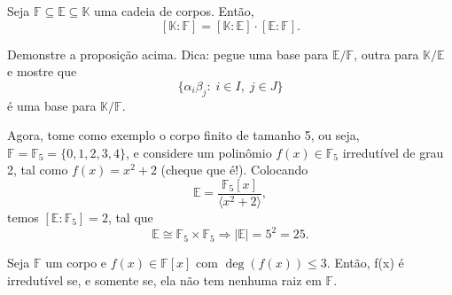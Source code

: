 \documentclass[../algebraIII_notes.tex]{subfiles}
\begin{document}
\begin{prop*}
	Seja \(\mathbb{F}\subseteq \mathbb{E}\subseteq \mathbb{K}\) uma cadeia de corpos. Então,
	\[
		[\mathbb{K}:\mathbb{F}] = [\mathbb{K}:\mathbb{E}] \cdot [\mathbb{E}:\mathbb{F}].
	\]
\end{prop*}
\begin{exr}
	Demonstre a proposição acima. Dica: pegue uma base para \(\mathbb{E}/\mathbb{F}\), outra para \(\mathbb{K}/\mathbb{E}\) e mostre que
	\[
		\{\alpha_{i}\beta_{j}:\; i\in I, \; j\in J\}
	\]
	é uma base para \(\mathbb{K}/\mathbb{F}\).
\end{exr}
\begin{example}
	Agora, tome como exemplo o corpo finito de tamanho 5, ou seja, \(\mathbb{F} = \mathbb{F}_{5} = \{0, 1, 2, 3, 4\}\), e considere um polinômio \(f(x)\in \mathbb{F}_{5}\) irredutível de grau 2, tal como \(f(x) = x^{2} + 2\) (cheque que é!). Colocando
	\[
		\mathbb{E} = \frac{\mathbb{F}_{5}[x]}{\langle x^{2}+2 \rangle},
	\]
	temos \([\mathbb{E}:\mathbb{F}_{5}] = 2\), tal que
	\[
		\mathbb{E} \cong \mathbb{F}_{5}\times \mathbb{F}_{5} \Rightarrow |\mathbb{E}| = 5^{2} = 25.
	\]
\end{example}
\begin{exr}
	Seja \(\mathbb{F}\) um corpo e \(f(x)\in \mathbb{F}[x]\) com \(\deg{(f(x))}\leq 3\). Então, f(x) é irredutível se, e somente se, ela não tem nenhuma raiz em \(\mathbb{F}.\)
\end{exr}
\end{document}
